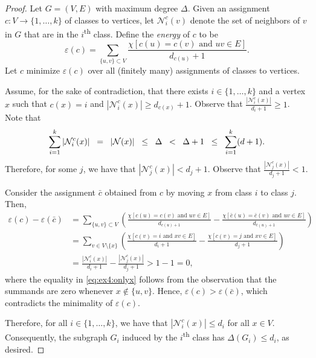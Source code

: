 \begin{proof}
Let \(G = (V, E)\) with maximum degree \(\Delta\).
Given an assignment \(c \colon V \to \{1, \ldots, k\}\) of classes to vertices,
let \(\mathcal{N}^c_i(v)\) denote the set of neighbors of \(v\) in \(G\) that are in the \(i\)\textsuperscript{th} class.
Define the \emph{energy} of \(c\) to be
\begin{equation}
    \varepsilon(c) = \sum_{\{u, v\} \subset V}
    \frac{
        \chi[c(u) = c(v) \text{ and } uv \in E]
    }{
        d_{c(u)} + 1
    }.
\end{equation}
Let \(c\) minimize \(\varepsilon(c)\) over all (finitely many) assignments of classes to vertices.

Assume,
for the sake of contradiction,
that there exists \(i \in \{1, \ldots, k\}\) and a vertex \(x\) such that \(c(x) = i\) and \(|\mathcal{N}^c_i(x)| \geq d_{c(x)} + 1\).
Observe that \( \frac{|\mathcal{N}^c_i(x)|}{d_i + 1} \geq 1 \).
Note that
\begin{equation}
    \thickmuskip=15mu
    \sum_{i=1}^k |\mathcal{N}^c_i(x)| = |\mathcal{N}(x)| \leq \Delta < \Delta + 1 \leq \sum_{i=1}^k (d+1).
\end{equation}
Therefore, for some \(j\), we have that \(|\mathcal{N}^c_j(x)| < d_j + 1\).
Observe that \( \frac{|\mathcal{N}^c_j(x)|}{d_j + 1} < 1 \).

Consider the assignment \(\bar{c}\) obtained from \(c\) by moving \(x\) from class \(i\) to class \(j\).
Then,
\begin{align}
    \varepsilon(c) - \varepsilon(\bar{c})
     & = \sum_{\{u, v\} \subset V} \left(
    \frac{\chi[c(u) = c(v) \text{ and } uv \in E]}{d_{c(u) + 1}}
    -
    \frac{\chi[\bar{c}(u) = \bar{c}(v) \text{ and } uv \in E]}{d_{\bar{c}(u) + 1}}
    \right)                                                                               \\
     & = \sum_{v \in V \setminus \{x\}}
    \left(
    \frac{\chi[c(v) = i \text{ and } xv \in E]}{d_i + 1}
    -
    \frac{\chi[c(v) = j \text{ and } xv \in E]}{d_j + 1}
    \right) \label{eq:ex4:onlyx}                                                          \\
     & = \frac{|\mathcal{N}^c_i(x)|}{d_i + 1} - \frac{|\mathcal{N}^c_j(x)|}{d_j + 1} > 1 - 1 = 0,
\end{align}
where the equality in \eqref{eq:ex4:onlyx} follows from the observation that the summands are zero whenever \(x \notin \{u, v\}\).
Hence, \(\varepsilon(c) > \varepsilon(\bar{c})\), which contradicts the minimality of \(\varepsilon(c)\).

Therefore,
for all \(i \in \{1, \ldots, k\}\),
we have that \(|\mathcal{N}^c_i(x)| \leq d_i\) for all \(x \in V\).
Consequently,
the subgraph \(G_i\) induced by the \(i\)\textsuperscript{th} class has \(\Delta\left(G_i\right) \leq d_i\), as desired.
\end{proof}

